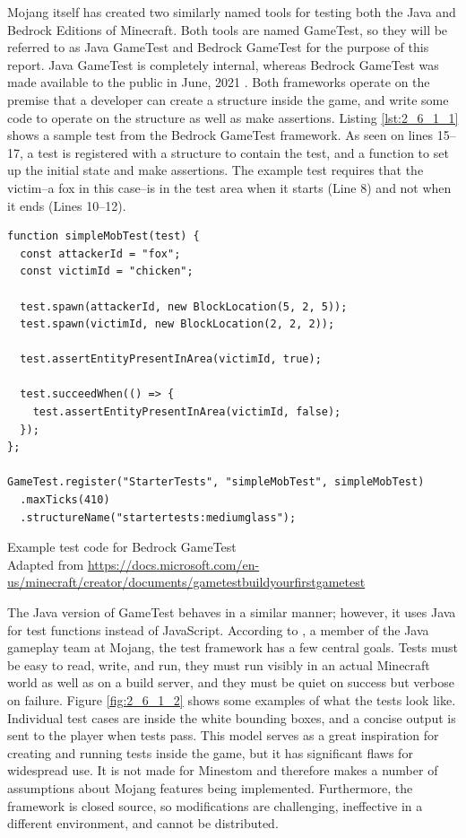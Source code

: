\documentclass[12pt]{article}
\newenvironment{longcode}{\captionsetup{type=listing}}{}
\begin{document}
\begin{onehalfspacing}
Mojang itself has created two similarly named tools for testing both the
Java and Bedrock Editions of Minecraft. Both tools are named GameTest,
so they will be referred to as Java GameTest and Bedrock GameTest for
the purpose of this report. Java GameTest is completely internal,
whereas Bedrock GameTest was made available to the public in June, 2021
\parencite{ammerlaan2021}. Both frameworks operate on the premise that a
developer can create a structure inside the game, and write some code to
operate on the structure as well as make assertions. Listing \ref{lst:2_6_1_1}
shows a sample test from the Bedrock GameTest framework. As seen on
lines 15--17, a test is registered with a structure to contain the test,
and a function to set up the initial state and make assertions. The
example test requires that the victim--a fox in this case--is in the
test area when it starts (Line 8) and not when it ends (Lines 10--12).


\begin{longcode}
\begin{verbatim}
function simpleMobTest(test) {
  const attackerId = "fox";
  const victimId = "chicken";

  test.spawn(attackerId, new BlockLocation(5, 2, 5));
  test.spawn(victimId, new BlockLocation(2, 2, 2));

  test.assertEntityPresentInArea(victimId, true);

  test.succeedWhen(() => {
    test.assertEntityPresentInArea(victimId, false);
  });
};

GameTest.register("StarterTests", "simpleMobTest", simpleMobTest)
  .maxTicks(410)
  .structureName("startertests:mediumglass");

\end{verbatim}
\caption{Example test code for Bedrock GameTest \\ Adapted from \url{https://docs.microsoft.com/en-us/minecraft/creator/documents/gametestbuildyourfirstgametest}
}
\label{lst:2_6_1_1}
\end{longcode}

The Java version of GameTest behaves in a similar manner; however, it
uses Java for test functions instead of JavaScript. According to \textcite{knilberg2020}, a member of the Java gameplay team at Mojang, the test
framework has a few central goals. Tests must be easy to read, write,
and run, they must run visibly in an actual Minecraft world as well as
on a build server, and they must be quiet on success but verbose on
failure. Figure \ref{fig:2_6_1_2} shows some examples of what the tests look like.
Individual test cases are inside the white bounding boxes, and a concise
output is sent to the player when tests pass. This model serves as a
great inspiration for creating and running tests inside the game, but it
has significant flaws for widespread use. It is not made for Minestom
and therefore makes a number of assumptions about Mojang features being
implemented. Furthermore, the framework is closed source, so
modifications are challenging, ineffective in a different environment,
and cannot be distributed.


\end{onehalfspacing}
\end{document}
